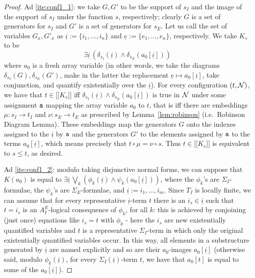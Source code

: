 \documentclass{LMCS}
\newcommand{\ue}{\ensuremath{\underline e}}
\newcommand{\ui}{\ensuremath{\underline i}}
\newcommand{\cN}{\ensuremath \mathcal N}
\newcommand{\mywidehat}[1]{\ensuremath{\lbrack\!\lbrack #1 \rbrack\!\rbrack}}
\theoremstyle{plain}\newtheorem{assumption}[thm]{Assumption}
\theoremstyle{plain}\newtheorem{proposition}[thm]{Proposition}
\theoremstyle{plain}\newtheorem{property}[thm]{Property}
\theoremstyle{plain}\newtheorem{example}[thm]{Example}
\theoremstyle{plain}\newtheorem{claim}[thm]{Claim}
\theoremstyle{plain}\newtheorem{lemma}[thm]{Lemma}
\begin{document}
\begin{proof}
Ad \eqref{ite:conf1_1}: we take $G, G'$ to be the support of $s_I$
  and the image of the support of $s_I$ under the function $s$,
  respectively; clearly $G$ is a set of generators for $s_I$ and $G'$
  is a set of generators for $s_E$. Let us call the set of variables
  $G_x, G'_x$ as $\ui:=\{i_1, \dots, i_n\}$ and $\ue:=\{e_1, \dots,
  e_n\}$, respectively. We take $K_s$ to be
  \begin{equation}\label{eq:diagformula}
    \exists \ui \, (\delta_{s_I}(\ui) \wedge \delta_{s_E}(a_0[\ui]))
  \end{equation}
  where $a_0$ is a fresh array variable (in other words, we take the
  diagrams $\delta_{s_I}(G), \delta_{s_E}(G')$, make in the latter the
  replacement $\ue \mapsto a_0[\ui]$, take conjunction, and quantify
  existentially over the $\ui$). For every configuration $(t, \cN)$,
  we have that $t\in \mywidehat{K_s}$ iff $\delta_{s_I}(\ui) \wedge
  \delta_{s_E}(a_0[\ui])$ is true in $\cN$ under some assignment ${\tt
    a}$ mapping the array variable $a_0$ to $t$, that is iff there are
  embeddings $\mu: s_I\longrightarrow t_I$ and $\nu:s_E\longrightarrow
  t_E$ as prescribed by Lemma~\ref{lem:robinson} (i.e.\ Robinson
  Diagram Lemma). These embeddings map the generators $G$ onto the
  indexes assigned to the $\ui$ by ${\tt a}$ and the generators $G'$
  to the elements assigned by ${\tt a}$ to the terms $a_0[\ui]$, which
  means precisely that $t\circ \mu= \nu\circ s$. Thus $t\in
  \mywidehat{K_s}$ is equivalent to $s\leq t$, as desired.

  Ad \eqref{ite:conf1_2}: modulo taking disjunctive normal forms, we
  can suppose that $K(a_0)$ is equal to $\exists \ui\,\bigvee_k
  (\phi_k(\ui)\wedge \psi_k(a_0[\ui]))$, where the $\phi_k$'s are
  $\Sigma_I$-formulae, the $\psi_k$'s are $\Sigma_E$-formulae, and
  $\ui:=i_1, \dots, i_m$.  Since $T_I$ is locally finite, we can
  assume that for every representative $\ui$-term $t$ there is an
  $i_s\in \ui$ such that $t=i_s$ is an $A^E_I$-logical consequence of
  $\phi_k$, for all $k$: this is achieved by conjoining (just once)
  equations like $i_s=t$ with $\phi_k$ - here the $i_s$ are new
  existentially quantified variables and $t$ is a representative
  $\Sigma_I$-term in which only the original existentially quantified
  variables occur. In this way, all elements in a substructure
  generated by $\ui$ are named explicitly and so are their
  $a_0$-images $a_0[\ui]$ (otherwise said, modulo $\phi_k(\ui)$, for
  every $\Sigma_I(\ui)$-term $t$, we have that $a_0[t]$ is equal to
  some of the $a_0[\ui]$).


\end{proof}
\end{document}
